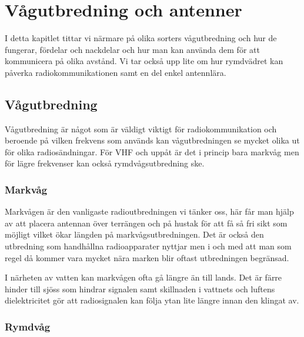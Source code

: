 \chapter{Vågutbredning och antenner}

I detta kapitlet tittar vi närmare på olika sorters vågutbredning och
hur de fungerar, fördelar och nackdelar och hur man kan använda dem
för att kommunicera på olika avstånd. Vi tar också upp lite om hur
rymdvädret kan påverka radiokommunikationen samt en del enkel
antennlära.

\vfill

\minitoc

\clearpage


\label{vågutbredning}


\section{Vågutbredning}

Vågutbredning är något som är väldigt viktigt för radiokommunikation och
beroende på vilken frekvens som används kan vågutbredningen se mycket olika ut
för olika radiosändningar. För VHF och uppåt är det i princip bara markvåg men
för lägre frekvenser kan också rymdvågsutbredning ske.

\subsection{Markvåg}

Markvågen är den vanligaste radioutbredningen vi tänker oss, här får man hjälp
av att placera antennan över terrängen och på hustak för att få så fri sikt
som möjligt vilket ökar längden på markvågsutbredningen. Det är också den
utbredning som handhållna radioapparater nyttjar men i och med att man som
regel då kommer vara mycket nära marken blir oftast utbredningen begränsad.

I närheten av vatten kan markvågen ofta gå längre än till lands. Det är färre
hinder till sjöss som hindrar signalen samt skillnaden i vattnets och luftens
dielektricitet gör att radiosignalen kan följa ytan lite längre innan den
klingat av.

\subsection{Rymdvåg}

